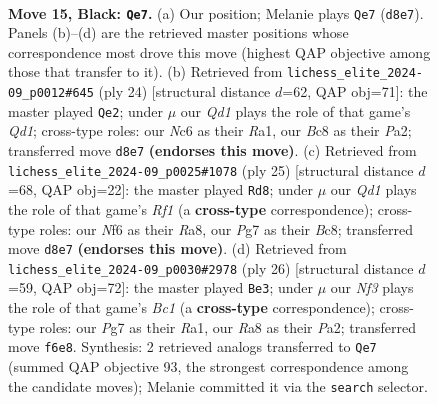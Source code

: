 \documentclass[11pt]{article}
\begin{document}
\clearpage

\begin{figure}[p]\centering
\begin{subfigure}{0.46\textwidth}\centering
\resizebox{\linewidth}{!}{%
\newchessgame
\chessboard[
  setfen={r1bq1rk1/pp3ppp/2n1pn2/2P5/2P5/4P3/P1N1BPPP/1RBQ1RK1 b - - 8 15},
  showmover=false,
  pgfstyle=straightmove, color=movearrow, markmove={d8-e7}
]}
\caption{}
\end{subfigure}\hfill
\begin{subfigure}{0.46\textwidth}\centering
\resizebox{\linewidth}{!}{%
\newchessgame
\chessboard[
  setfen={r1bq1rk1/pp2bppp/2n1p3/4P3/2B1N3/5N2/PP3PPP/R2Q1RK1 w - - 2 13},
  showmover=false,
  pgfstyle=straightmove, color=movearrow, markmove={d1-e2}
]}
\caption{}
\end{subfigure}
\\[4pt]
\begin{subfigure}{0.46\textwidth}\centering
\resizebox{\linewidth}{!}{%
\newchessgame
\chessboard[
  setfen={rqb2rk1/pp3pbp/2nB1np1/8/8/2P2NP1/PP2PPBP/R2Q1RK1 b - - 0 13},
  showmover=false,
  pgfstyle=straightmove, color=movearrow, markmove={f8-d8}
]}
\caption{}
\end{subfigure}\hfill
\begin{subfigure}{0.46\textwidth}\centering
\resizebox{\linewidth}{!}{%
\newchessgame
\chessboard[
  setfen={r1bq1rk1/2p1bpp1/p6p/2p1p3/2P1P3/2N5/PP3PPP/R1BQR1K1 w - - 0 14},
  showmover=false,
  pgfstyle=straightmove, color=movearrow, markmove={c1-e3}
]}
\caption{}
\end{subfigure}
\caption{\textbf{Move 15, Black: \texttt{Qe7}.} (a) Our position; Melanie plays \texttt{Qe7} (\texttt{d8e7}). Panels (b)--(d) are the retrieved master positions whose correspondence most drove this move (highest QAP objective among those that transfer to it). (b) Retrieved from \texttt{lichess\_elite\_2024-09\_p0012\#645} (ply 24) [structural distance $d$=62, QAP obj=71]: the master played \texttt{Qe2}; under $\mu$ our \emph{Qd1} plays the role of that game's \emph{Qd1}; cross-type roles: our \emph{N}c6 as their \emph{R}a1, our \emph{B}c8 as their \emph{P}a2; transferred move \texttt{d8e7} \textbf{(endorses this move)}. (c) Retrieved from \texttt{lichess\_elite\_2024-09\_p0025\#1078} (ply 25) [structural distance $d$=68, QAP obj=22]: the master played \texttt{Rd8}; under $\mu$ our \emph{Qd1} plays the role of that game's \emph{Rf1} (a \textbf{cross-type} correspondence); cross-type roles: our \emph{N}f6 as their \emph{R}a8, our \emph{P}g7 as their \emph{B}c8; transferred move \texttt{d8e7} \textbf{(endorses this move)}. (d) Retrieved from \texttt{lichess\_elite\_2024-09\_p0030\#2978} (ply 26) [structural distance $d$=59, QAP obj=72]: the master played \texttt{Be3}; under $\mu$ our \emph{Nf3} plays the role of that game's \emph{Bc1} (a \textbf{cross-type} correspondence); cross-type roles: our \emph{P}g7 as their \emph{R}a1, our \emph{R}a8 as their \emph{P}a2; transferred move \texttt{f6e8}. Synthesis: 2 retrieved analogs transferred to \texttt{Qe7} (summed QAP objective 93, the strongest correspondence among the candidate moves); Melanie committed it via the \texttt{search} selector.}
\label{fig:thought-m29}
\end{figure}
\end{document}
